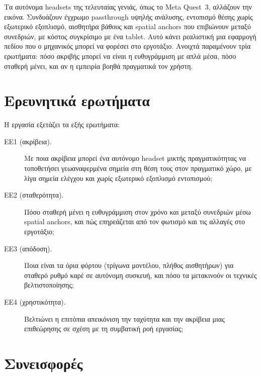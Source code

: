 Τα αυτόνομα headsets της τελευταίας γενιάς, όπως το Meta Quest~3, αλλάζουν την εικόνα. Συνδυάζουν έγχρωμο passthrough υψηλής ανάλυσης, εντοπισμό θέσης χωρίς εξωτερικό εξοπλισμό, αισθητήρα βάθους και spatial anchors που επιβιώνουν μεταξύ συνεδριών, με κόστος συγκρίσιμο με ένα tablet. Αυτό κάνει ρεαλιστική μια εφαρμογή πεδίου που ο μηχανικός μπορεί να φορέσει στο εργοτάξιο. Ανοιχτά παραμένουν τρία ερωτήματα: πόσο ακριβής μπορεί να είναι η ευθυγράμμιση με απλά μέσα, πόσο σταθερή μένει, και αν η εμπειρία βοηθά πραγματικά τον χρήστη.

\section{Ερευνητικά ερωτήματα}
\label{sec:rq}

Η εργασία εξετάζει τα εξής ερωτήματα:

\begin{description}
  \item[ΕΕ1 (ακρίβεια).] Με ποια ακρίβεια μπορεί ένα αυτόνομο headset μικτής πραγματικότητας να τοποθετήσει γεωαναφερμένα σημεία στη θέση τους στον πραγματικό χώρο, με λίγα σημεία ελέγχου και χωρίς εξωτερικό εξοπλισμό εντοπισμού;
  \item[ΕΕ2 (σταθερότητα).] Πόσο σταθερή μένει η ευθυγράμμιση στον χρόνο και μεταξύ συνεδριών μέσω spatial anchors, και πώς επηρεάζεται από τον φωτισμό και τις αλλαγές στο εργοτάξιο;
  \item[ΕΕ3 (απόδοση).] Ποια είναι τα όρια φόρτου (τρίγωνα μοντέλου, πλήθος αισθητήρων) για σταθερό ρυθμό καρέ σε αυτόνομη συσκευή, και πόσο τα μετακινούν οι τεχνικές βελτιστοποίησης;
  \item[ΕΕ4 (χρηστικότητα).] Βελτιώνει η επιτόπια απεικόνιση την ταχύτητα και την ακρίβεια μιας επιθεώρησης σε σχέση με τη συμβατική ροή εργασίας;
\end{description}

\section{Συνεισφορές}
\label{sec:contributions}

